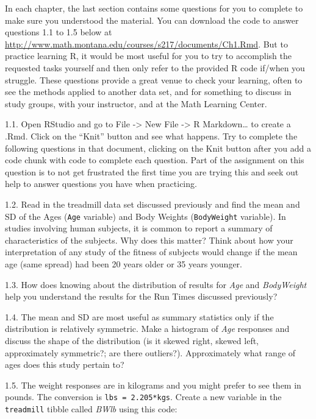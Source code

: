 \documentclass[
]{book}
\newenvironment{Shaded}{\begin{snugshade}}{\end{snugshade}}
\newcommand{\FloatTok}[1]{\textcolor[rgb]{0.00,0.00,0.81}{#1}}
\newcommand{\NormalTok}[1]{#1}
\newcommand{\OtherTok}[1]{\textcolor[rgb]{0.56,0.35,0.01}{#1}}
\newcommand{\SpecialCharTok}[1]{\textcolor[rgb]{0.00,0.00,0.00}{#1}}
\begin{document}
In each chapter, the last section contains some questions for you to complete
to make sure you understood the
material. You can download the code to answer questions 1.1 to 1.5 below at
\url{http://www.math.montana.edu/courses/s217/documents/Ch1.Rmd}. But to practice
learning R, it would be most useful for you to try to accomplish the requested tasks
yourself and then only refer to the provided R code if/when you struggle.
These questions provide a great venue to check your learning, often to see the
methods applied to another data set, and for something to discuss in study groups,
with your instructor, and at the Math Learning Center.

1.1. Open RStudio and go to File -\textgreater{} New File -\textgreater{} R Markdown\ldots{} to create a .Rmd.
Click on the ``Knit'' button and see what happens. Try to complete the following
questions in that document, clicking on the Knit button after you add a code
chunk with code to complete each question. Part of the assignment on this
question is to not get frustrated the first time you are trying this and seek
out help to answer questions you have when practicing.

1.2. Read in the treadmill data set
discussed previously and find the mean and SD of the Ages (\texttt{Age} variable) and Body
Weights (\texttt{BodyWeight} variable). In studies involving human subjects, it is
common to report a
summary of characteristics of the subjects. Why does this matter? Think about
how your interpretation of any study of the fitness of subjects would change if
the mean age (same spread) had been 20 years older or 35 years younger.

1.3. How does knowing about the
distribution of results for \emph{Age} and \emph{BodyWeight} help you understand the
results for the Run Times discussed previously?

1.4. The mean and SD are most useful
as summary statistics only if the distribution is relatively symmetric. Make a
histogram of \emph{Age} responses and
discuss the shape of the distribution (is it skewed right, skewed left,
approximately symmetric?; are there outliers?). Approximately what range of
ages does this study pertain to?

1.5. The weight responses are in
kilograms and you might prefer to see them in pounds. The conversion is
\texttt{lbs\ =\ 2.205*kgs}. Create a new variable in the \texttt{treadmill}
tibble called \emph{BWlb} using this code:

\begin{Shaded}
\end{Shaded}
\end{document}
